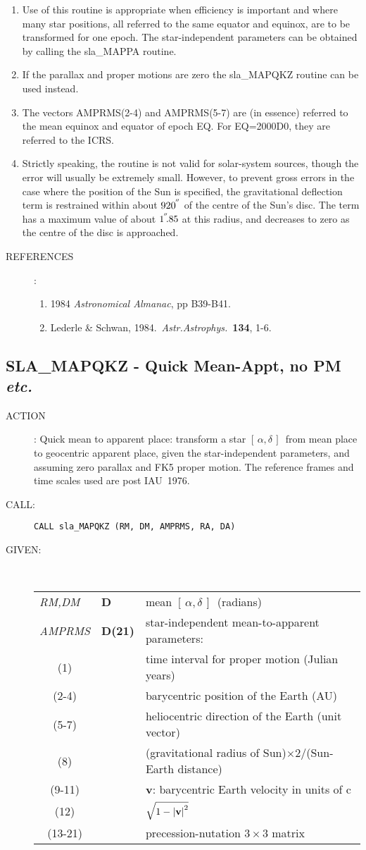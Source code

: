 \documentclass[11pt,twoside]{article}
\newcommand{\xlabel}[1]{}
\newcommand{\radec}     {$[\,\alpha,\delta\,]$}
\newcommand{\arcsec}[2] {\arcseci{#1}$\hspace{-0.4em}.#2$}
\newcommand{\arcsec}[2] {
      {$#1\hspace{-0.05em}^{'\hspace{-0.1em}'}\hspace{-0.4em}.#2$}
   }
\newcommand{\arcseci}[1] {$#1\hspace{-0.05em}$\raisebox{-0.5ex}
                         {$^{'\hspace{-0.1em}'}$}}
\renewcommand{\arcseci}[1] {$#1\hspace{-0.05em}^{'\hspace{-0.1em}'}$}
\newcommand{\routine}[3]
{\hbadness=10000
  \vbox
  {
    \rule{\textwidth}{0.3mm}\\
    {\Large {\bf #1} \hfill #2 \hfill {\bf #1}}\\
    \setlength{\oldspacing}{\topsep}
    \setlength{\topsep}{0.3ex}
    \begin{description}
      #3
    \end{description}
    \setlength{\topsep}{\oldspacing}
  }
}
\renewcommand{\routine}[3]
   {
      \subsection{#1\xlabel{#1} - #2\label{#1}}
       \begin{description}
         #3
       \end{description}
   }
\newcommand{\action}[1]
{\item[ACTION]: #1}
\newcommand{\action}[1]
   {\item[ACTION:] #1}
\newcommand{\call}[1]
{\item[CALL]: \hspace{0.4em}{\tt #1}}
\newlength{\oldspacing}
\renewcommand{\call}[1]
   {
    \item[CALL:] {\tt #1}
   }
\newcommand{\args}[2]
{
  \goodbreak
  \setlength{\oldspacing}{\topsep}
  \setlength{\topsep}{0.3ex}
  \begin{description}
  \item[#1]:\\[1.5ex]
    \begin{tabular}{p{7em}p{6em}p{22em}}
      #2
    \end{tabular}
  \end{description}
  \setlength{\topsep}{\oldspacing}
}
\renewcommand{\args}[2]
   {
     \begin{description}
        \item[#1:]\\
        \begin{tabular}{p{7em}p{6em}l}
           #2
        \end{tabular}
     \end{description}
   }
\newcommand{\spec}[3]
{
  {\em {#1}} & {\bf \mbox{#2}} & {#3}
}
\newcommand{\specel}[2]
{
  \multicolumn{1}{c}{#1} & {} & {#2}
}
\newcommand{\refs}[1]
{
  \goodbreak
  \setlength{\oldspacing}{\topsep}
  \setlength{\topsep}{0.3ex}
  \begin{description}
    \item[REFERENCES]:
        #1
  \end{description}
  \setlength{\topsep}{\oldspacing}
}
\newcommand{\refs}[1]
   {
     \begin{description}
       \item[REFERENCES:]
           #1
     \end{description}
   }
\begin{document}
{
 \begin{enumerate}
  \item Use of this routine is appropriate when efficiency is important
        and where many star positions, all referred to the same equator
        and equinox, are to be transformed for one epoch.  The
        star-independent parameters can be obtained by calling the
        sla\_MAPPA routine.
  \item If the parallax and proper motions are zero the sla\_MAPQKZ
        routine can be used instead.
  \item The vectors AMPRMS(2-4) and AMPRMS(5-7) are
        (in essence) referred to
        the mean equinox and equator of epoch EQ.  For
        EQ=2000D0, they are referred to the ICRS.
  \item Strictly speaking, the routine is not valid for solar-system
        sources, though the error will usually be extremely small.
        However, to prevent gross errors in the case where the
        position of the Sun is specified, the gravitational
        deflection term is restrained within about \arcseci{920} of the
        centre of the Sun's disc.  The term has a maximum value of
        about \arcsec{1}{85} at this radius, and decreases to zero as
        the centre of the disc is approached.
 \end{enumerate}
}
\refs
{
 \begin{enumerate}
  \item 1984 {\it Astronomical Almanac}, pp B39-B41.
  \item Lederle \& Schwan, 1984.\ {\it Astr.Astrophys.}\ {\bf 134}, 1-6.
 \end{enumerate}
}
\routine{SLA\_MAPQKZ}{Quick Mean-Appt, no PM {\it etc.}}
{
 \action{Quick mean to apparent place:  transform a star \radec\ from
         mean place to geocentric apparent place, given the
         star-independent parameters, and assuming zero parallax
         and FK5 proper motion.
         The reference frames and time scales used are post IAU~1976.}
 \call{CALL sla\_MAPQKZ (RM, DM, AMPRMS, RA, DA)}
}
\args{GIVEN}
{
 \spec{RM,DM}{D}{mean \radec\ (radians)} \\
 \spec{AMPRMS}{D(21)}{star-independent mean-to-apparent parameters:} \\
 \specel   {(1)}     {time interval for proper motion (Julian years)} \\
 \specel   {(2-4)}   {barycentric position of the Earth (AU)} \\
 \specel   {(5-7)}   {heliocentric direction of the Earth (unit vector)} \\
 \specel   {(8)}     {(gravitational radius of
                      Sun)$\times 2 / $(Sun-Earth distance)} \\
 \specel   {(9-11)}  {{\bf v}: barycentric Earth velocity in units of c} \\
 \specel   {(12)}    {$\sqrt{1-\left|\mbox{\bf v}\right|^2}$} \\
 \specel   {(13-21)} {precession-nutation $3\times3$ matrix}
}
\end{document}
